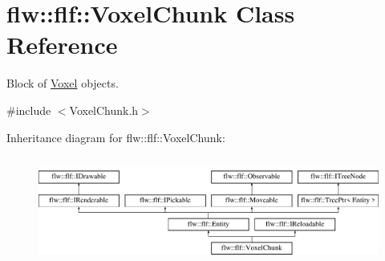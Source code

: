 \hypertarget{classflw_1_1flf_1_1VoxelChunk}{}\section{flw\+:\+:flf\+:\+:Voxel\+Chunk Class Reference}
\label{classflw_1_1flf_1_1VoxelChunk}


Block of \hyperlink{classflw_1_1flf_1_1Voxel}{Voxel} objects.  




{\ttfamily \#include $<$Voxel\+Chunk.\+h$>$}

Inheritance diagram for flw\+:\+:flf\+:\+:Voxel\+Chunk\+:\begin{figure}[H]
\begin{center}
\leavevmode
\includegraphics[height=3.589744cm]{classflw_1_1flf_1_1VoxelChunk}
\end{center}
\end{figure}
